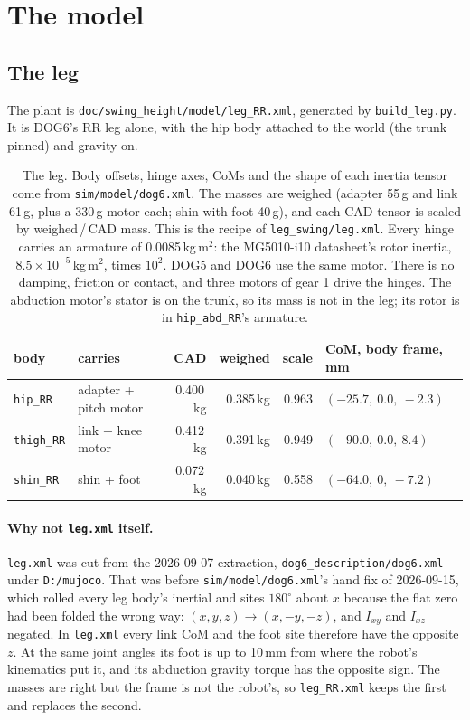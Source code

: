 \documentclass[11pt,a4paper]{article}
\newcommand{\code}[1]{\texttt{#1}}
\begin{document}
\section{The model}
\label{sec:model}

\subsection{The leg}

The plant is \code{doc/swing\_height/model/leg\_RR.xml}, generated by
\code{build\_leg.py}. It is DOG6's RR leg alone, with the hip body attached to
the world (the trunk pinned) and gravity on.

\begin{table}[h]
\centering\small
\begin{tabular}{llrrrl}
\toprule
body & carries & CAD & weighed & scale & CoM, body frame, mm \\
\midrule
\code{hip\_RR} & adapter + pitch motor & 0.400\,kg & 0.385\,kg & 0.963 & $(-25.7,\ 0.0,\ -2.3)$ \\
\code{thigh\_RR} & link + knee motor & 0.412\,kg & 0.391\,kg & 0.949 & $(-90.0,\ 0.0,\ 8.4)$ \\
\code{shin\_RR} & shin + foot & 0.072\,kg & 0.040\,kg & 0.558 & $(-64.0,\ 0,\ -7.2)$ \\
\bottomrule
\end{tabular}
\caption{The leg. Body offsets, hinge axes, CoMs and the shape of each inertia
tensor come from \code{sim/model/dog6.xml}. The masses are weighed (adapter
55\,g and link 61\,g, plus a 330\,g motor each; shin with foot 40\,g), and each
CAD tensor is scaled by weighed\,/\,CAD mass. This is the recipe of
\code{leg\_swing/leg.xml}. Every hinge carries an armature of
0.0085\,kg\,m$^2$: the MG5010-i10 datasheet's rotor inertia,
$8.5\times10^{-5}$\,kg\,m$^2$, times $10^2$. DOG5 and DOG6 use the same motor.
There is no
damping, friction or contact, and three motors of gear 1 drive the hinges.
The abduction motor's stator is on the trunk, so its mass is not in the leg;
its rotor is in \code{hip\_abd\_RR}'s armature.}
\label{tab:leg}
\end{table}

\paragraph{Why not \code{leg.xml} itself.} \code{leg.xml} was cut from the
2026-09-07 extraction, \code{dog6\_description/}\allowbreak\code{dog6.xml}
under \code{D:/mujoco}. That was before
\code{sim/model/dog6.xml}'s hand fix of 2026-09-15, which rolled every leg
body's inertial and sites $180^\circ$ about $x$ because the flat zero had been
folded the wrong way: $(x,y,z)\to(x,-y,-z)$, and $I_{xy}$ and $I_{xz}$ negated.
In \code{leg.xml} every link CoM and the foot site therefore have the opposite
$z$. At the same joint angles its foot is up to 10\,mm from where the robot's
kinematics put it, and its abduction gravity torque has the opposite sign. The
masses are right but the frame is not the robot's, so \code{leg\_RR.xml} keeps
the first and replaces the second.
\end{document}
